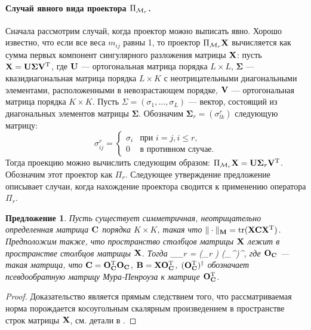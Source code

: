 \documentclass[12pt,a4paper,fleqn,leqno]{article}
\DeclareMathOperator{\tr}{tr}
\newtheorem{proposition}{Предложение}%
\begin{document}
\paragraph{Случай явного вида проектора $\Pi_{\mathcal{M}_r}$.} Сначала рассмотрим случай, когда проектор можно выписать явно.
Хорошо известно, что если все веса $m_{ij}$ равны 1, то проектор $\Pi_{\mathcal{M}_r} \mathbf{X}$
вычисляется как сумма первых компонент сингулярного разложения матрицы $\mathbf{X}$: пусть $\mathbf{X} = \mathbf{U} \mathbf{\Sigma} \mathbf{V}^{\mathrm{T}}$, где $\mathbf{U}$ --- ортогональная матрица порядка $L \times L$, $\mathbf{\Sigma}$ --- квазидиагональная матрица порядка $L \times K$ с неотрицательными диагональными элементами, расположенными в невозрастающем порядке, $\mathbf{V}$ --- ортогональная матрица порядка $K \times K$. Пусть $\Sigma = (\sigma_1, \ldots, \sigma_L)$ --- вектор, состоящий из диагональных элементов матрицы $\mathbf{\Sigma}$. Обозначим $\mathbf{\Sigma}_r = (\sigma^r_{l k})$ следующую матрицу:
\begin{equation*}
\sigma^r_{i j} = \begin{cases}
\sigma_i & \text{при $i = j, i \le r,$}\\
0 & \text{в противном случае}.
\end{cases}
\end{equation*}
Тогда проекцию можно вычислить следующим образом: $\Pi_{\mathcal{M}_r} \mathbf{X}  = \mathbf{U} \mathbf{\Sigma}_r \mathbf{V}^{\mathrm{T}}$.
Обозначим этот проектор как $\Pi_r$.
Следующее утверждение предложение описывает случаи, когда нахождение проектора
сводится к применению оператора $\Pi_r$. %

\begin{proposition}
\label{prop:projS}
Пусть существует симметричная, неотрицательно определенная матрица  $\mathbf{C}$ порядка $K \times K$,
такая что $\|\cdot\|_\bfM = \tr(\bfX \bfC \bfX^\rmT)$.
Предположим также, что пространство столбцов матрицы $\mathbf{X}$ лежит в пространстве столбцов матрицы $\mathbf{X}$.
Тогда 
\be
\label{eq:PiMr}
\Pi_{\calM_r} \bfX = (\Pi_r \bfB) (\bfO_\bfC^{\rmT})^\dagger,
\ee
где $\mathbf{O}_{\mathbf{C}}$ --- такая матрица, что $\mathbf{C} = \mathbf{O}_{\mathbf{C}}^{\mathrm{T}}\mathbf{O}_{\mathbf{C}}$,
$\mathbf{B} = \mathbf{X} \mathbf{O}_{\mathbf{C}}^{\mathrm{T}}$, $(\mathbf{O}_{\mathbf{C}}^{\mathrm{T}})^\dagger$ обозначает псевдообратную матрицу Мура-Пенроуза к матрице $\mathbf{O}_{\mathbf{C}}^{\mathrm{T}}$.
\end{proposition}
\begin{proof}
Доказательство является прямым следствием того, что рассматриваемая норма порождается косоугольным скалярным произведением в пространстве строк матрицы $\mathbf{X}$, см. детали в \cite{Golyandina2013}.
\end{proof}
\end{document}
